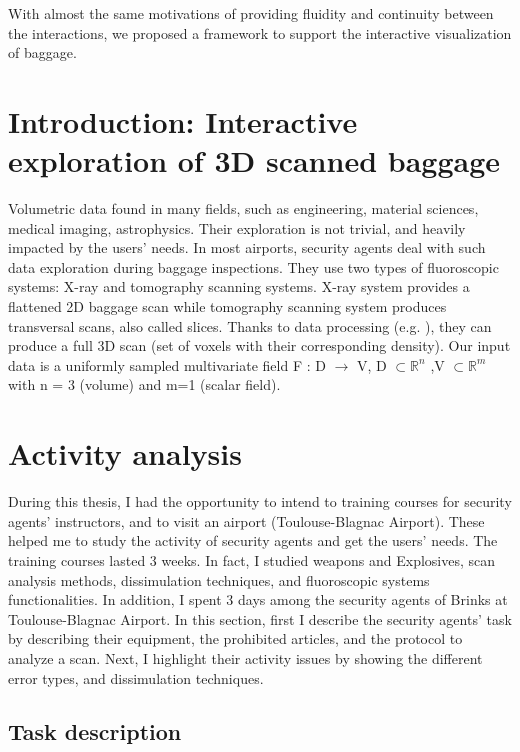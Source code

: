 With almost the same motivations of providing fluidity and continuity between the interactions, we proposed a framework to support the interactive visualization of baggage.

\section{Introduction: Interactive exploration of 3D scanned baggage}
Volumetric data found in many fields, such as engineering, material sciences, medical imaging, astrophysics. Their exploration is not trivial, and heavily impacted by the users' needs. In most airports, security agents deal with such data exploration during baggage inspections. They use two types of fluoroscopic systems: X-ray and tomography scanning systems. X-ray system provides a flattened 2D baggage scan while tomography scanning system produces transversal scans, also called slices. 
Thanks to data processing (e.g. \cite{deans2007radon}), they can produce a full 3D scan (set of voxels with their corresponding density).
Our input data is a uniformly sampled multivariate field F : D $\longrightarrow$ V, D $\subset \mathbb{R}^{n}$ 
,V $\subset \mathbb{R}^{m}$ with n = 3 (volume) and m=1 (scalar field).



\section{Activity analysis}

During this thesis, I had the opportunity to intend to training courses for security agents' instructors, and to visit an airport (Toulouse-Blagnac Airport). These helped me to study the activity of security agents and get the users' needs. The training courses lasted 3 weeks. In fact, I studied weapons and Explosives, scan analysis methods, dissimulation techniques, and fluoroscopic systems functionalities. In addition, I spent 3 days among the security agents of Brinks at Toulouse-Blagnac Airport. In this section, first I describe the security agents' task by describing their equipment, the prohibited articles, and the protocol to analyze a scan. Next, I highlight their activity issues by showing the different error types, and dissimulation techniques.

\subsection{Task description}

